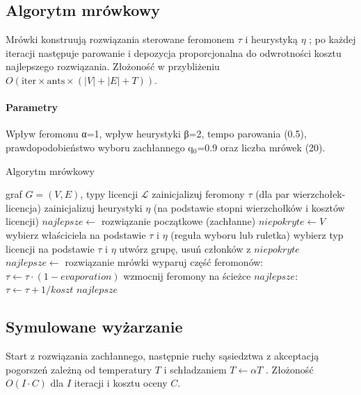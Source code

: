\subsection{Algorytm mrówkowy}\label{subsec:aco}
Mrówki konstruują rozwiązania sterowane feromonem \(\tau\) i heurystyką \(\eta\) \cite{dorigo1997}; po każdej iteracji następuje parowanie i depozycja proporcjonalna do odwrotności kosztu najlepszego rozwiązania. Złożoność w przybliżeniu \(O(\text{iter}\times\text{ants}\times(|V|+|E|+T))\).

\paragraph{Parametry}
Wpływ feromonu α=1, wpływ heurystyki β=2, tempo parowania (0.5), prawdopodobieństwo wyboru zachłannego q$_0$=0.9 oraz liczba mrówek (20).

\begin{algorithm}[H]
  \caption{Algorytm mrówkowy}
  \label{alg:aco}
  \begin{algorithmic}[1]
    \Require graf $G=(V,E)$, typy licencji $\mathcal{L}$
    \State zainicjalizuj feromony $\tau$ (dla par wierzchołek-licencja)
    \State zainicjalizuj heurystyki $\eta$ (na podstawie stopni wierzchołków i kosztów licencji)
    \State $najlepsze \gets$ rozwiązanie początkowe (zachłanne)
    \State $niepokryte \gets V$
    \State wybierz właściciela na podstawie $\tau$ i $\eta$ (reguła wyboru lub ruletka)
    \State wybierz typ licencji na podstawie $\tau$ i $\eta$
    \State utwórz grupę, usuń członków z $niepokryte$
    \EndWhile
    \State $najlepsze \gets$ rozwiązanie mrówki
    \EndIf
    \EndFor
    \State wyparuj część feromonów: $\tau \gets \tau \cdot (1-evaporation)$
    \State wzmocnij feromony na ścieżce $najlepsze$: $\tau \gets \tau + 1/koszt$
    \EndFor
    \State \Return $najlepsze$
  \end{algorithmic}
\end{algorithm}

\subsection{Symulowane wyżarzanie }\label{subsec:sa}
Start z rozwiązania zachłannego, następnie ruchy sąsiedztwa z akceptacją pogorszeń zależną od temperatury \(T\) i schładzaniem \(T\leftarrow \alpha T\) \cite{kirkpatrick1983}. Złożoność \(O(I\cdot C)\) dla \(I\) iteracji i kosztu oceny \(C\).

